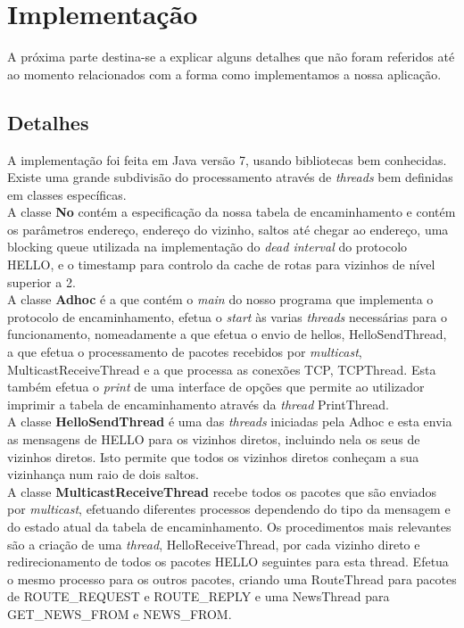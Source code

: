 \documentclass{llncs}
\begin{document}
\section{Implementação}

A próxima parte destina-se a explicar alguns detalhes que não foram referidos até ao momento relacionados com a forma como implementamos a nossa aplicação.

\subsection{Detalhes}

A implementação foi feita em Java versão 7, usando bibliotecas bem conhecidas.
Existe uma grande subdivisão do processamento através de \emph{threads} bem definidas em classes específicas.
\\

A classe \textbf{No} contém a especificação da nossa tabela de encaminhamento e contém os parâmetros endereço, endereço do vizinho, saltos até chegar ao endereço, uma blocking queue utilizada na implementação do \emph{dead interval} do protocolo HELLO, e o timestamp para controlo da cache de rotas para vizinhos de nível superior a 2.
\\

A classe \textbf{Adhoc} é a que contém o \emph{main} do nosso programa que implementa o protocolo de encaminhamento, efetua o \emph{start} às varias \emph{threads} necessárias para o funcionamento, nomeadamente a que efetua o envio de hellos, HelloSendThread, a que efetua o processamento de pacotes recebidos por \emph{multicast}, MulticastReceiveThread e a que processa as conexões TCP, TCPThread. Esta também efetua o \emph{print} de uma interface de opções que permite ao utilizador imprimir a tabela de encaminhamento através da \emph{thread} PrintThread.
\\

A classe \textbf{HelloSendThread} é uma das \emph{threads} iniciadas pela Adhoc e esta envia as mensagens de HELLO para os vizinhos diretos, incluindo nela os seus de vizinhos diretos. Isto permite que todos os vizinhos diretos conheçam a sua vizinhança num raio de dois saltos.
\\

A classe \textbf{MulticastReceiveThread} recebe todos os pacotes que são enviados por \emph{multicast}, efetuando diferentes processos dependendo do tipo da mensagem e do estado atual da tabela de encaminhamento. Os procedimentos mais relevantes são a criação de uma \emph{thread}, HelloReceiveThread, por cada vizinho direto e redirecionamento de todos os pacotes HELLO seguintes para esta thread. Efetua o mesmo processo para os outros pacotes, criando uma RouteThread para pacotes de ROUTE\_REQUEST e ROUTE\_REPLY e uma NewsThread para GET\_NEWS\_FROM e NEWS\_FROM.
\\
\end{document}
